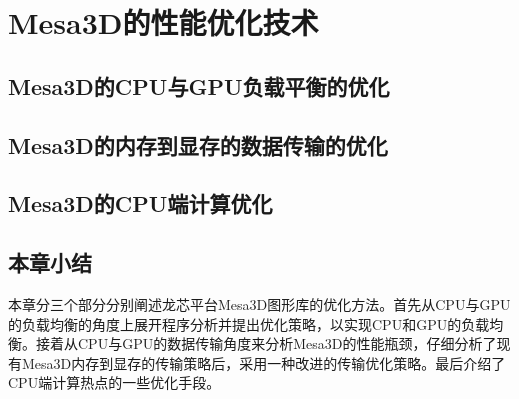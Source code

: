 
\chapter{Mesa3D的性能优化技术}

\section{Mesa3D的CPU与GPU负载平衡的优化}


\section{Mesa3D的内存到显存的数据传输的优化}


\section{Mesa3D的CPU端计算优化}


\section{本章小结}
本章分三个部分分别阐述龙芯平台Mesa3D图形库的优化方法。首先从CPU与GPU的负载均衡的角度上展开程序分析并提出优化策略，以实现CPU和GPU的负载均衡。接着从CPU与GPU的数据传输角度来分析Mesa3D的性能瓶颈，仔细分析了现有Mesa3D内存到显存的传输策略后，采用一种改进的传输优化策略。最后介绍了CPU端计算热点的一些优化手段。
